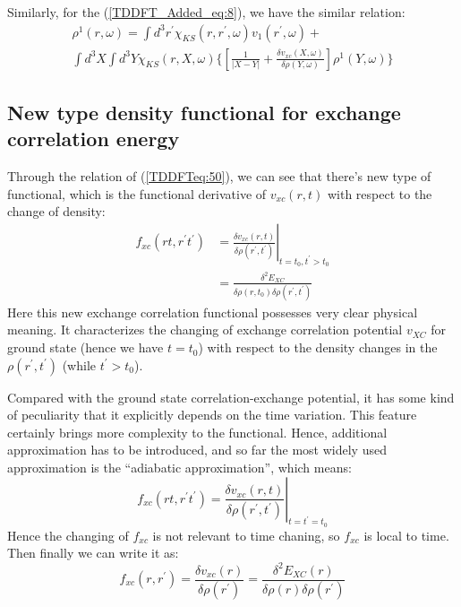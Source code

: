 Similarly, for the (\ref{TDDFT_Added_eq:8}), we have the similar
relation:
\begin{multline}\label{TDDFTeq:25}
\rho^{1}(r,\omega) = \int d^{3}r^{'}\chi_{KS}(r, r^{'},
\omega)
v_{1}(r^{'},\omega) + \\
\int d^{3}X \int d^{3}Y\chi_{KS}(r, X, \omega)
\Bigg\{\left[\frac{1}{|X-Y|} + \frac{\delta v_{xc}(X,\omega)}{\delta
\rho(Y,\omega)}\right]\rho^{1}(Y,\omega) \Bigg\}
\end{multline}



\subsection{New type density functional for exchange correlation
energy}
%
%
%
%
%
Through the relation of (\ref{TDDFTeq:50}), we can see that there's
new type of functional, which is the functional derivative of
$v_{xc}(r,t)$ with respect to the change of density:
\begin{align}\label{TDDFT_EXC_eq:1}
f_{xc}(rt,r^{'}t^{'}) &= \left. \frac{\delta v_{xc}(r,t)}{\delta
\rho(r^{'},t^{'})}\right|_{t=t_{0}, t^{'} > t_{0}} \nonumber \\
&=\frac{\delta^{2} E_{XC} }{\delta \rho(r,t_{0}) \delta
\rho(r^{'},t^{'})}
\end{align}
Here this new exchange correlation functional possesses very clear
physical meaning. It characterizes the changing of exchange
correlation potential $v_{XC}$ for ground state (hence we have
$t=t_{0}$) with respect to the density changes in the
$\rho(r^{'},t^{'})$ (while $t^{'} > t_{0}$).

Compared with the ground state correlation-exchange potential, it
has some kind of peculiarity that it explicitly depends on the time
variation. This feature certainly brings more complexity to the
functional. Hence, additional approximation has to be introduced, and
so far the most widely used approximation is the ``adiabatic
approximation'', which means:
\begin{equation}
 \label{TDDFT_EXC_eq:2}
f_{xc}(rt,r^{'}t^{'}) = \left. \frac{\delta v_{xc}(r,t)}{\delta
\rho(r^{'},t^{'})}\right|_{t = t^{'} = t_{0}}
\end{equation}
Hence the changing of $f_{xc}$ is not relevant to time chaning, so
$f_{xc}$ is local to time. Then finally we can write it as:
\begin{equation}
  \label{TDDFT_EXC_eq:3}
f_{xc}(r,r^{'}) = \frac{\delta v_{xc}(r)}{\delta
\rho(r^{'})} = \frac{\delta^{2} E_{XC} (r)}{\delta
\rho(r) \delta
\rho(r^{'})}
\end{equation} 

